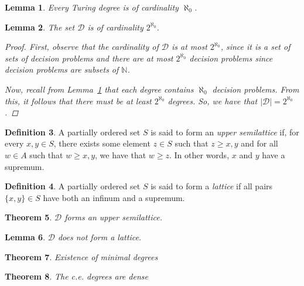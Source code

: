 \documentclass[psamsfonts]{amsart}
\newtheorem{thm}{Theorem}[section]
\newtheorem{lem}[thm]{Lemma}
\theoremstyle{definition}
\newtheorem{defn}[thm]{Definition}
\theoremstyle{remark}
\numberwithin{equation}{section}
\begin{document}
\begin{lem}
  \label{lem:deg_count}
  Every Turing degree is of cardinality $\aleph_0$.
\end{lem}


\begin{lem}
  The set $\mathcal{D}$ is of cardinality $2^{\aleph_0}$.
  \begin{proof}
    First, observe that the cardinality of $\mathcal{D}$ is at most
    $2^{\aleph_0}$, since it is a set of sets of decision problems and there are
    at most $2^{\aleph_0}$ decision problems since decision problems are subsets
    of $\mathbb{N}$.\par Now, recall from Lemma~\ref{lem:deg_count} that each
    degree contains $\aleph_0$ decision problems. From this, it follows that
    there must be at least $2^{\aleph_0}$ degrees. So, we have that $\lvert \mathcal{D} \rvert=2^{\aleph_0}$.
  \end{proof}
\end{lem}

\begin{defn}
  A partially ordered set $S$ is said to form an \emph{upper semilattice} if, for every
 $x,y\in S$, there exists some element $z\in S$ such that $z \geq x,y$ and
 for all $w\in A$ such that $w\geq x,y$, we have that $w \geq z$. In other
 words, $x$ and $y$ have a supremum.
\end{defn}

\begin{defn}
  A partially ordered set $S$ is said to form a \emph{lattice} if all pairs
  $\{x,y\}\in S$ have both an infinum and a supremum.
\end{defn}


\begin{thm}
  $\mathcal{D}$ forms an upper semilattice.
  \cite{kleene54_upper_semi_lattic_degrees_recur_unsol}
\end{thm}
\begin{lem}
 $ \mathcal{D}$ does not form a lattice.
  \cite{kleene54_upper_semi_lattic_degrees_recur_unsol}
\end{lem}

\begin{thm}
  Existence of minimal degrees
  \cite{spector56_degrees_recur_unsol}
  \cite{shoenfield66_theor_minim_degrees}
\end{thm}

\begin{thm}
  The c.e. degrees are dense
  \cite{sacks64:_recur_enumer_degrees_dense}
\end{thm}
\end{document}
